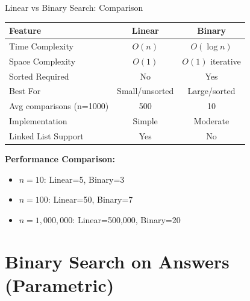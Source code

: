\documentclass[aspectratio=169]{beamer}
\begin{document}
\begin{frame}{Linear vs Binary Search: Comparison}
  \begin{center}
  \begin{tabular}{|l|c|c|}
    \hline
    \textbf{Feature} & \textbf{Linear} & \textbf{Binary} \\
    \hline
    Time Complexity & $O(n)$ & $O(\log n)$ \\
    \hline
    Space Complexity & $O(1)$ & $O(1)$ iterative \\
    \hline
    Sorted Required & No & Yes \\
    \hline
    Best For & Small/unsorted & Large/sorted \\
    \hline
    Avg comparisons (n=1000) & 500 & 10 \\
    \hline
    Implementation & Simple & Moderate \\
    \hline
    Linked List Support & Yes & No \\
    \hline
  \end{tabular}
  \end{center}

  \vspace{0.3cm}
  \textbf{Performance Comparison:}
  \begin{itemize}
    \item $n=10$: Linear=5, Binary=3
    \item $n=100$: Linear=50, Binary=7
    \item $n=1,000,000$: Linear=500,000, Binary=20
  \end{itemize}
\end{frame}

\section{Binary Search on Answers (Parametric)}
\end{document}
